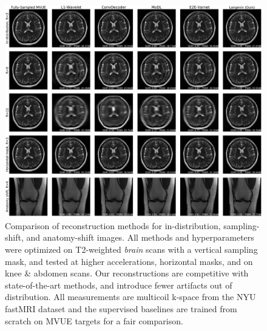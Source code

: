 \documentclass{article}
\begin{document}
\begin{figure}[t]
    \centering
    \includegraphics[width=\linewidth]{main-qualitative-comp.pdf}
    \caption{\small Comparison of reconstruction methods for
        in-distribution, sampling-shift, and anatomy-shift images.
        All methods and hyperparameters were optimized on T2-weighted
        \emph{brain} scans with a vertical sampling mask, and tested
        at higher accelerations, horizontal masks, and on knee \&
        abdomen scans.  Our reconstructions are competitive with
        state-of-the-art methods, and introduce fewer artifacts out of
        distribution.  All measurements are multicoil k-space from the
        NYU fastMRI dataset and the supervised baselines are trained
        from scratch on MVUE targets for a fair comparison.}
    \label{fig:main}
\end{figure}
\end{document}
